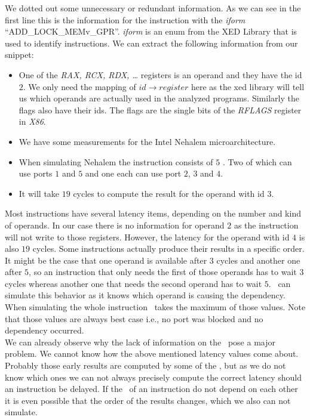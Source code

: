 We dotted out some unnecessary or redundant information. As we can see in the first line this is the information for the instruction with the \emph{iform} ``ADD\_LOCK\_MEMv\_GPR''. \emph{iform} is an enum from the XED Library \cite{xed} that is used to identify instructions. We can extract the following information from our snippet:

\begin{itemize}
    \item One of the \emph{RAX, RCX, RDX, \dots} registers is an operand and they have the id $2$. We only need the mapping of $id \rightarrow register$ here as the xed library will tell us which operands are actually used in the analyzed programs. Similarly the flags also have their ids. The flags are the single bits of the \emph{RFLAGS} register in \emph{X86}.
    \item We have some measurements for the Intel Nehalem microarchitecture.
    \item When simulating Nehalem the instruction consists of $5$ \microops. Two of which can use ports $1$ and $5$ and one each can use port $2$, $3$ and $4$.
    \item It will take $19$ cycles to compute the result for the operand with id $3$.
\end{itemize}

Most instructions have several latency items, depending on the number and kind of operands. In our case there is no information for operand $2$ as the instruction will not write to those registers. However, the latency for the operand with id $4$ is also $19$ cycles. Some instructions actually produce their results in a specific order. It might be the case that one operand is available after $3$ cycles and another one after $5$, so an instruction that only needs the first of those operands has to wait $3$ cycles whereas another one that needs the second operand has to wait $5$. \suaca\ can simulate this behavior as it knows which operand is causing the dependency. When simulating the whole instruction \suaca\ takes the maximum of those values. Note that those values are always best case i.e., no port was blocked and no dependency occurred.\\
We can already observe why the lack of information on the \microops\ pose a major problem. We cannot know how the above mentioned latency values come about. Probably those early results are computed by some of the \microops, but as we do not know which ones we can not always precisely compute the correct latency should an instruction be delayed. If the \microops\ of an instruction do not depend on each other it is even possible that the order of the results changes, which we also can not simulate.

